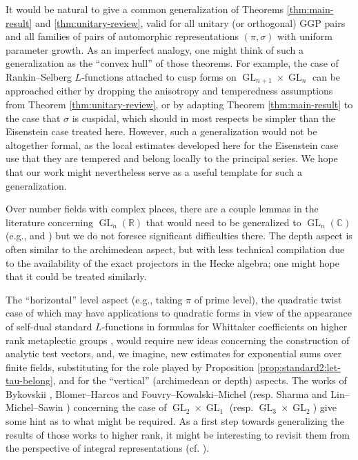 \documentclass[reqno]{amsart}
\DeclareMathOperator{\GL}{GL}
\theoremstyle{plain} \newtheorem{theorem} {Theorem}
\theoremstyle{definition} \newtheorem{definition} [theorem] {Definition}
\theoremstyle{itplain} %
\numberwithin{equation}{section}
\numberwithin{theorem}{section}
\begin{document}
It would be natural to give a common generalization of Theorems \ref{thm:main-result} and \ref{thm:unitary-review}, valid for all unitary (or orthogonal) GGP pairs and all families of pairs of automorphic representations $(\pi,\sigma)$ with uniform parameter growth.  As an imperfect analogy, one might think of such a generalization as the ``convex hull'' of those theorems.  For example, the case of Rankin--Selberg $L$-functions attached to cusp forms on $\GL_{n+1} \times \GL_n$ can be approached either by dropping the anisotropy and temperedness assumptions from Theorem \ref{thm:unitary-review}, or by adapting Theorem \ref{thm:main-result} to the case that $\sigma$ is cuspidal, which should in most respects be simpler than the Eisenstein case treated here.  However, such a generalization would not be altogether formal, as the local estimates developed here for the Eisenstein case use that they are tempered and belong locally to the principal series.  We hope that our work might nevertheless serve as a useful template for such a generalization.

Over number fields with complex places, there are a couple lemmas in the literature concerning $\GL_n(\mathbb{R})$ that would need to be generalized to $\GL_n(\mathbb{C})$ (e.g., \cite[Lemma 3]{MR2733072} and \cite[Lemma 5.2]{JN19a}) but we do not foresee significant difficulties there.  The depth aspect is often similar to the archimedean aspect, but with less technical compilation due to the availability of the exact projectors in the Hecke algebra; one might hope that it could be treated similarly.

The ``horizontal'' level aspect (e.g., taking $\pi$ of prime level), the quadratic twist case of which may have applications to quadratic forms in view of the appearance of self-dual standard $L$-functions in formulas for Whittaker coefficients on higher rank metaplectic groups \cite{MR3267120, MR3619910, MR3649366}, would require new ideas concerning the construction of analytic test vectors, and, we imagine, new estimates for exponential sums over finite fields, substituting for the role played by Proposition \ref{prop:standard2:let-tau-belong}, \cite[Thm 4.2 (iii) and Thm 15.1]{2020arXiv201202187N} and \cite[\S16--17]{2020arXiv201202187N} for the ``vertical'' (archimedean or depth) aspects.  The works of Bykovskii \cite{MR1433344}, Blomer--Harcos \cite{MR2431250, MR3259045} and Fouvry--Kowalski--Michel \cite{MR3334236} (resp.  Sharma \cite{2019arXiv190609493S} and Lin--Michel--Sawin \cite{2019arXiv191209473L}) concerning the case of $\GL_2 \times \GL_1$ (resp. $\GL_3 \times \GL_2$) give some hint as to what might be required.  As a first step towards generalizing the results of those works to higher rank, it might be interesting to revisit them from the perspective of integral representations (cf.  \cite{2020arXiv200201993N, MR4206609, 2020arXiv200406791S}).
\end{document}
